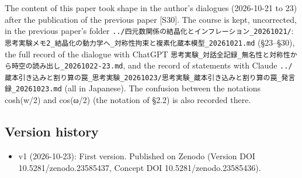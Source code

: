 \documentclass[
  a4paper,
]{article}
\providecommand{\tightlist}{%
  \setlength{\itemsep}{0pt}\setlength{\parskip}{0pt}}
\begin{document}
The content of this paper took shape in the author's dialogues
(2026-10-21 to 23) after the publication of the previous paper
{[}S30{]}. The course is kept, uncorrected, in the previous paper's
folder \texttt{../\allowbreak{}四元数関係の結晶化とインフレーション\_\allowbreak{}20261021/\allowbreak{}}:
\texttt{思考実験メモ2\_\allowbreak{}結晶化の動力学へ\_\allowbreak{}対称性拘束と複素化蔵本模型\_\allowbreak{}20261021.md}
(§23--§30), the full record of the dialogue with ChatGPT
\texttt{思考実験\_\allowbreak{}対話全記録\_\allowbreak{}無名性と対称性から時空の読み出し\_\allowbreak{}20261022-23.md},
and the record of statements with Claude
\texttt{../\allowbreak{}蔵本引き込みと割り算の罠\_\allowbreak{}思考実験\_\allowbreak{}20261023/\allowbreak{}思考実験\_\allowbreak{}蔵本引き込みと割り算の罠\_\allowbreak{}発言録\_\allowbreak{}20261023.md}
(all in Japanese). The confusion between the notations cosh(w/2) and
cos(ω/2) (the notation of §2.2) is also recorded there.

\subsection{Version history}\label{version-history}

\begin{itemize}
\tightlist
\item
  v1 (2026-10-23): First version. Published on Zenodo (Version DOI
  10.5281/zenodo.23585437, Concept DOI 10.5281/zenodo.23585436).
\end{itemize}
\end{document}
